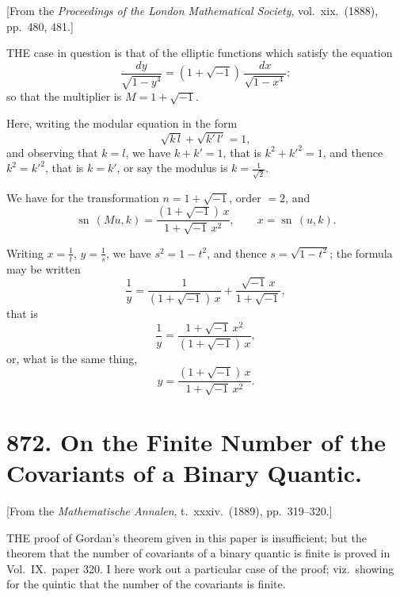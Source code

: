 \documentclass[12pt,a4paper]{article}
\theoremstyle{plain}
\DeclareMathOperator{\sn}{sn}
\begin{document}
[From the \textit{Proceedings of the London Mathematical Society}, vol.\ xix.\ (1888), pp.\ 480, 481.]

\medskip\noindent
THE case in question is that of the elliptic functions which satisfy the equation
\[
\frac{dy}{\sqrt{1 - y^{4}}} = (1 + \sqrt{-1})\,\frac{dx}{\sqrt{1 - x^{4}}};
\]
so that the multiplier is $M = 1 + \sqrt{-1}$.

Here, writing the modular equation in the form
\[
\sqrt{k\,l} + \sqrt{k'\,l'} = 1,
\]
and observing that $k = l$, we have $k + k' = 1$, that is $k^{2} + k'^{2} = 1$, and thence $k^{2} = k'^{2}$, that is $k = k'$, or say the modulus is $k = \frac{1}{\sqrt{2}}$.

We have for the transformation $n = 1 + \sqrt{-1}$, order $= 2$, and
\[
\sn\,(Mu, k) = \frac{(1 + \sqrt{-1})\,x}{1 + \sqrt{-1}\,x^{2}}, \qquad x = \sn\,(u, k).
\]

Writing $x = \frac{1}{t}$, $y = \frac{1}{s}$, we have $s^{2} = 1 - t^{2}$, and thence $s = \sqrt{1 - t^{2}}$; the formula may be written
\[
\frac{1}{y} = \frac{1}{(1 + \sqrt{-1})\,x} + \frac{\sqrt{-1}\,x}{1 + \sqrt{-1}},
\]
that is
\[
\frac{1}{y} = \frac{1 + \sqrt{-1}\,x^{2}}{(1 + \sqrt{-1})\,x},
\]
or, what is the same thing,
\[
y = \frac{(1 + \sqrt{-1})\,x}{1 + \sqrt{-1}\,x^{2}}.
\]

\newpage
\section[872]{872. On the Finite Number of the Covariants of a Binary Quantic.}
\label{sec:872}

[From the \textit{Mathematische Annalen}, t.\ xxxiv.\ (1889), pp.\ 319--320.]

\medskip\noindent
THE proof of Gordan's theorem given in this paper is insufficient; but the theorem that the number of covariants of a binary quantic is finite is proved in Vol.\ IX.\ paper 320. I here work out a particular case of the proof; viz.\ showing for the quintic that the number of the covariants is finite.
\end{document}
